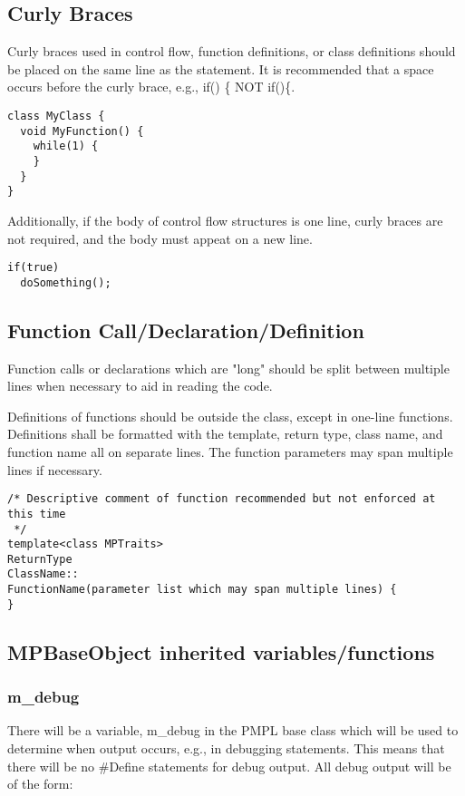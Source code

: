 \documentclass[12pt]{article}
\begin{document}
\subsection{Curly Braces}
Curly braces used in control flow, function definitions, or class definitions
should be placed on the same line as the statement. It is recommended that a
space occurs before the curly brace, e.g., if() \{ NOT if()\{.

\begin{lstlisting}
class MyClass {
  void MyFunction() {
    while(1) {
    }
  }
}
\end{lstlisting}

Additionally, if the body of control flow structures is one line, curly braces
are not required, and the body must appeat on a new line.

\begin{lstlisting}
if(true)
  doSomething();
\end{lstlisting}

\subsection{Function Call/Declaration/Definition}
Function calls or declarations which are "long" should be split between multiple
lines when necessary to aid in reading the code.

Definitions of functions should be outside the class, except in one-line
functions. Definitions shall be formatted with the template, return type, class
name, and function name all on separate lines. The function parameters may span
multiple lines if necessary.

\begin{lstlisting}
/* Descriptive comment of function recommended but not enforced at this time
 */
template<class MPTraits>
ReturnType
ClassName::
FunctionName(parameter list which may span multiple lines) {
}
\end{lstlisting}

\subsection{MPBaseObject inherited variables/functions}

\subsubsection{m\_debug}

There will be a variable, m\_debug in the PMPL base class which will be used to
determine when output occurs, e.g., in debugging statements. This means that
there will be no \#Define statements for debug output. All debug output will be
of the form:
\end{document}
